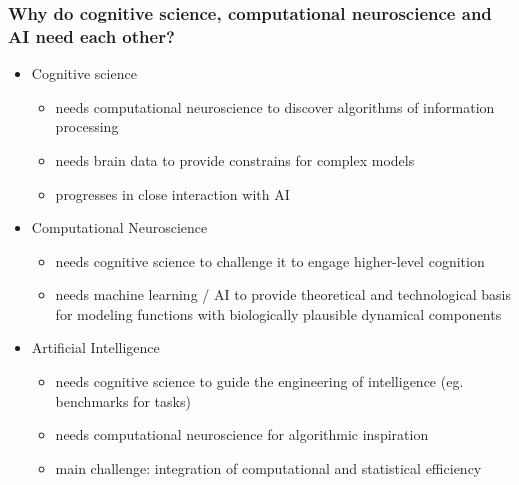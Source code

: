\documentclass[
t, %
10pt, %
aspectratio=1610, %
ngerman,
english,
]{beamer}
\begin{document}
\begin{frame}
    \frametitle{Why do cognitive science, computational neuroscience and AI need each other?}
    \begin{itemize}
     \item Cognitive science
     \begin{itemize}
      \item needs computational neuroscience to discover algorithms of information processing
      \item needs brain data to provide constrains for complex models
      \item progresses in close interaction with AI
     \end{itemize}
    \item Computational Neuroscience
    \begin{itemize}
     \item needs cognitive science to challenge it to engage higher-level cognition
     \item needs machine learning / AI to provide theoretical and technological basis for modeling functions with biologically plausible dynamical components
    \end{itemize}
    \item Artificial Intelligence
    \begin{itemize}
     \item needs cognitive science to guide the engineering of intelligence (eg. benchmarks for tasks)
     \item needs computational neuroscience for algorithmic inspiration
     \item main challenge: integration of computational and statistical efficiency
    \end{itemize}
    \end{itemize}
\end{frame}
\end{document}
